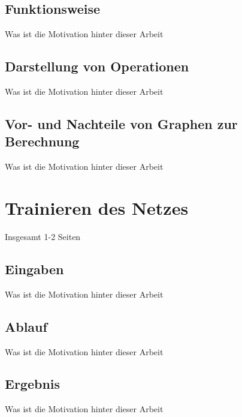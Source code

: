 \subsection{Funktionsweise}
\label{sec:graphenFunktionsweise}
Was ist die Motivation hinter dieser Arbeit

\subsection{Darstellung von Operationen}
\label{sec:darstellungOperationen}
Was ist die Motivation hinter dieser Arbeit

\subsection{Vor- und Nachteile von Graphen zur Berechnung}
\label{sec:vorUndNachteile}
Was ist die Motivation hinter dieser Arbeit

\section{Trainieren des Netzes}
\label{sec:trainierenDesNetzes}
\printsubchapterauthor{\authorNiklas}
Insgesamt 1-2 Seiten


\subsection{Eingaben}
\label{sec:eingaben}
Was ist die Motivation hinter dieser Arbeit

\subsection{Ablauf}
\label{sec:ablauf}
Was ist die Motivation hinter dieser Arbeit

\subsection{Ergebnis}
\label{sec:ergebnis}
Was ist die Motivation hinter dieser Arbeit